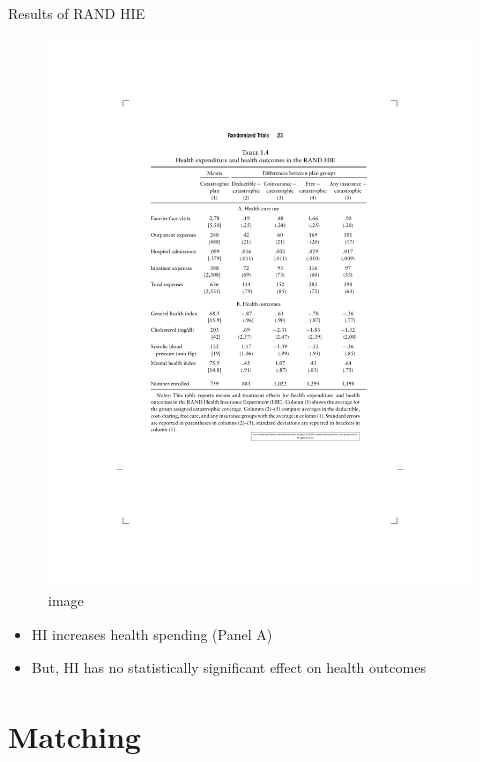 \documentclass[
  ignorenonframetext,
]{beamer}
\begin{document}
\begin{frame}{Results of RAND HIE}
\protect\hypertarget{results-of-rand-hie}{}
\begin{figure}
\centering
\includegraphics{figure_table/MMtbl14.pdf}
\caption{image}
\end{figure}

\begin{itemize}
\item
  HI increases health spending (Panel A)
\item
  But, HI has no statistically significant effect on health outcomes
\end{itemize}
\end{frame}

\hypertarget{matching}{%
\section{Matching}\label{matching}}
\end{document}

